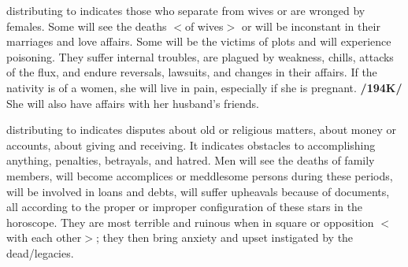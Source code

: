 \Saturn\xspace distributing to \Venus\xspace indicates those who separate from wives or are wronged by females. Some will see the deaths $<$of wives$>$ or will be inconstant in their marriages and love affairs. Some will be the victims of plots and will experience poisoning. They suffer internal troubles, are plagued by weakness, chills, attacks of the flux, and endure reversals, lawsuits, and changes in their affairs. If the nativity is of a women, she will live in pain, especially if she is pregnant. \textbf{/194K/} She will also have affairs with her husband’s friends.

\Saturn\xspace distributing to \Mercury\xspace indicates disputes about old or religious matters, about money or
accounts, about giving and receiving. It indicates obstacles to accomplishing anything, penalties, betrayals, and hatred. Men will see the deaths of family members, will become accomplices or meddlesome persons during these periods, will be involved in loans and debts, will suffer upheavals because of documents, all according to the proper or improper configuration of these stars in the horoscope. They are most terrible and ruinous when in square or opposition $<$with each other$>$; they then bring
anxiety and upset instigated by the dead/legacies.

\newpage